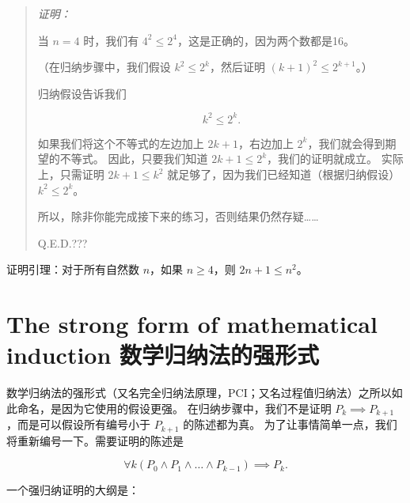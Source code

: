 \begin{quote} \emph{证明：}

当 $n=4$ 时，我们有 $4^2 \leq 2^4$，这是正确的，因为两个数都是16。

（在归纳步骤中，我们假设 $k^2 \leq 2^k$，然后证明 $(k+1)^2 \leq 2^{k+1}$。）

归纳假设告诉我们

\[ k^2 \leq 2^k.
\]

如果我们将这个不等式的左边加上 $2k+1$，右边加上 $2^k$，我们就会得到期望的不等式。
因此，只要我们知道 $2k+1 \leq 2^k$，我们的证明就成立。
实际上，只需证明 $2k+1 \leq k^2$ 就足够了，因为我们已经知道（根据归纳假设）$k^2 \leq 2^k$。

所以，除非你能完成接下来的练习，否则结果仍然存疑……

\rule{0pt}{0pt} \newline \rule{0pt}{15pt} \hfill Q.E.D.???
\end{quote}

\begin{exer} 
证明引理：对于所有自然数 $n$，如果 $n \geq 4$，则 $2n+1 \leq n^2$。
\end{exer}

\newpage
  



\newpage
 
\section{The strong form of mathematical induction 数学归纳法的强形式}
\label{sec:strong_induct}

数学归纳法的强形式（又名完全归纳法原理，PCI；又名过程值归纳法）之所以如此命名，是因为它使用的假设更强。
在归纳步骤中，我们不是证明 $P_k \implies P_{k+1}$，而是可以假设所有编号小于 $P_{k+1}$ 的陈述都为真。
为了让事情简单一点，我们将重新编号一下。需要证明的陈述是

\[ \forall k (P_0 \land P_1 \land \ldots \land  P_{k-1}) \implies P_k.
\]

一个强归纳证明的大纲是：

